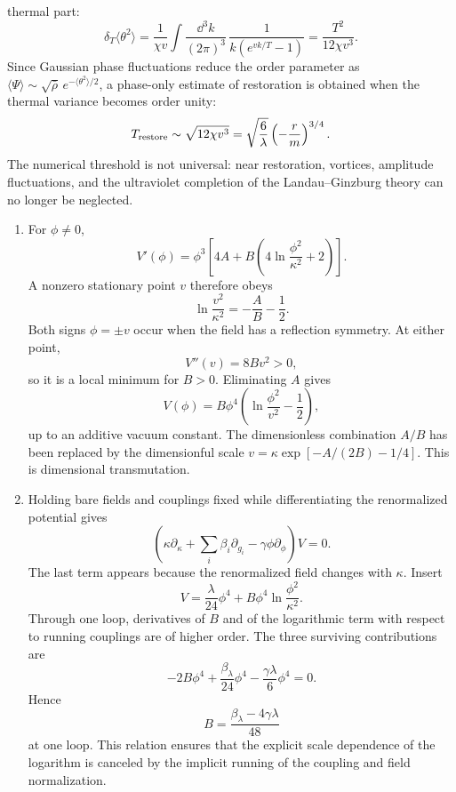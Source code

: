 \begin{enumerate}
\begin{enumerate}
    thermal part:
    \[
      \delta_T\langle\theta^2\rangle
        =\frac1{\chi v}\int\frac{\dd^3k}{(2\pi)^3}\,
          \frac1{k(e^{vk/T}-1)}
        =\frac{T^2}{12\chi v^3}.
    \]
    Since Gaussian phase fluctuations reduce the order parameter as
    \(\langle\Psi\rangle\sim\sqrt{\bar\rho}\,
    e^{-\langle\theta^2\rangle/2}\), a phase-only estimate of restoration is
    obtained when the thermal variance becomes order unity:
    \[
      T_{\rm restore}\sim\sqrt{12\chi v^3}
        =\sqrt{\frac6\lambda}\left(-\frac rm\right)^{3/4}.
    \]
    The numerical threshold is not universal: near restoration, vortices,
    amplitude fluctuations, and the ultraviolet completion of the
    Landau--Ginzburg theory can no longer be neglected.
  \end{enumerate}

  \begin{enumerate}
    \item[(a)]
    For \(\phi\ne0\),
    \[
      V'(\phi)
        =\phi^3\left[
          4A+B\left(4\ln\frac{\phi^2}{\kappa^2}+2\right)\right].
    \]
    A nonzero stationary point \(v\) therefore obeys
    \[
      \ln\frac{v^2}{\kappa^2}=-\frac{A}{B}-\frac12.
    \]
    Both signs \(\phi=\pm v\) occur when the field has a reflection
    symmetry.  At either point,
    \[
      V''(v)=8Bv^2>0,
    \]
    so it is a local minimum for \(B>0\).  Eliminating \(A\) gives
    \[
      V(\phi)
        =B\phi^4\left(\ln\frac{\phi^2}{v^2}-\frac12\right),
    \]
    up to an additive vacuum constant.  The dimensionless combination
    \(A/B\) has been replaced by the dimensionful scale
    \(v=\kappa\exp[-A/(2B)-1/4]\).  This is dimensional transmutation.
    \item[(b)]
    Holding bare fields and couplings fixed while differentiating the
    renormalized potential gives
    \[
      \left(\kappa\partial_\kappa
        +\sum_i\beta_i\partial_{g_i}
        -\gamma\phi\partial_\phi\right)V=0.
    \]
    The last term appears because the renormalized field changes with
    \(\kappa\).  Insert
    \[
      V=\frac{\lambda}{24}\phi^4
        +B\phi^4\ln\frac{\phi^2}{\kappa^2}.
    \]
    Through one loop, derivatives of \(B\) and of the logarithmic term with
    respect to running couplings are of higher order.  The three surviving
    contributions are
    \[
      -2B\phi^4+\frac{\beta_\lambda}{24}\phi^4
        -\frac{\gamma\lambda}{6}\phi^4=0.
    \]
    Hence
    \[
      \boxed{
        B=\frac{\beta_\lambda-4\gamma\lambda}{48}}
    \]
    at one loop.  This relation ensures that the explicit scale dependence
    of the logarithm is canceled by the implicit running of the coupling and
    field normalization.
  \end{enumerate}


\end{enumerate}
